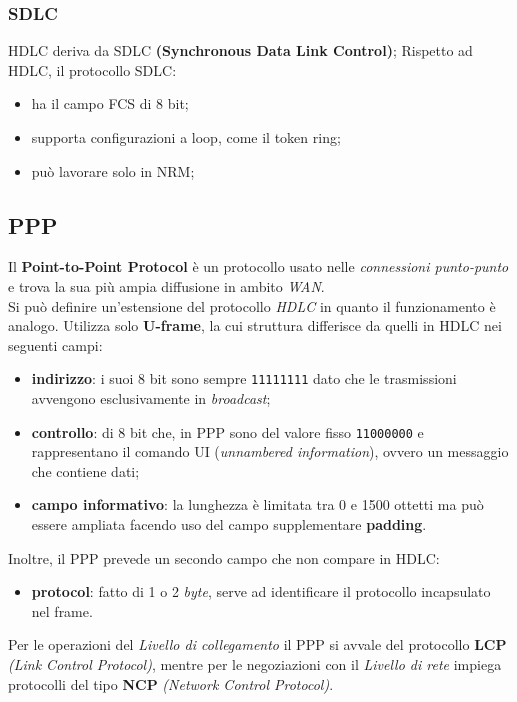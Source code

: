 \documentclass[a4paper,11pt]{article}
\def\code#1{\texttt{#1}}
\begin{document}
\subsubsection{SDLC}
HDLC deriva da SDLC \textbf{(Synchronous Data Link Control)};
Rispetto ad HDLC, il protocollo SDLC:
\begin{itemize}
	\item ha il campo FCS di 8 bit;
	\item supporta configurazioni a loop, come il token ring;
	\item può lavorare solo in NRM;
\end{itemize}
\subsection{PPP}
Il \textbf{Point-to-Point Protocol} è un protocollo usato nelle \textit{connessioni punto-punto} e trova la sua più ampia diffusione in ambito \textit{WAN}.
\\Si può definire un'estensione del protocollo \textit{HDLC} in quanto il funzionamento è analogo. Utilizza solo \textbf{U-frame}, la cui struttura differisce da quelli in HDLC nei seguenti campi:
\begin{itemize}
	\item \textbf{indirizzo}: i suoi 8 bit sono sempre \code{11111111} dato che le trasmissioni avvengono esclusivamente in \textit{broadcast};
	\item \textbf{controllo}: di 8 bit che, in PPP sono del valore fisso \code{11000000} e rappresentano il comando UI (\textit{unnambered information}), ovvero un messaggio che contiene dati;
	\item \textbf{campo informativo}: la lunghezza è limitata tra 0 e 1500 ottetti ma può essere ampliata facendo uso del campo supplementare \textbf{padding}.
\end{itemize}
Inoltre, il PPP prevede un secondo campo che non compare in HDLC: 
\begin{itemize}
	\item \textbf{protocol}: fatto di 1 o 2 \textit{byte}, serve ad identificare il protocollo incapsulato nel frame.
\end{itemize}

Per le operazioni del \textit{Livello di collegamento} il PPP si avvale del protocollo \textbf{LCP}\textit{ (Link Control Protocol)}, mentre per le negoziazioni con il \textit{Livello di rete} impiega protocolli del tipo \textbf{NCP}\textit{ (Network Control Protocol)}.
\newpage
\end{document}
